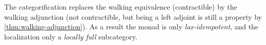 The categorification replaces the walking equivalence (contractible) by the walking adjunction (not contractible, but being a left adjoint is still a property by \cref{thm:walking-adjunction}).
As a result the monad is only \emph{lax-idempotent}, and the localization only a \emph{locally full} subcategory.
